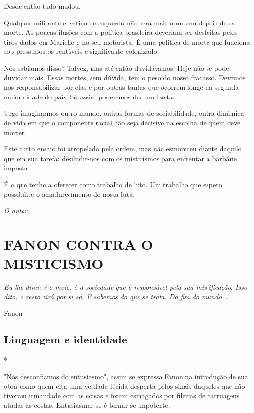 Desde então tudo mudou.

Qualquer militante e crítico de esquerda não será mais o mesmo depois
dessa morte. As poucas ilusões com a política brasileira deveriam ser
desfeitas pelos tiros dados em Marielle e no seu motorista. É uma
política de morte que funciona sob pressupostos rentáveis e significante
colonizado.

Nós sabíamos disso? Talvez, mas até então duvidávamos. Hoje não se pode
duvidar mais. Essas mortes, sem dúvida, tem o peso do nosso fracasso.
Devemos nos responsabilizar por elas e por outras tantas que ocorrem
longe da segunda maior cidade do país. Só assim poderemos dar um basta.

Urge imaginarmos outro mundo, outras formas de sociabilidade, outra
dinâmica de vida em que o componente racial não seja decisivo na escolha
de quem deve morrer.

Este curto ensaio foi atropelado pela ordem, mas não esmoreceu diante
daquilo que era sua tarefa: desiludir-nos com os misticismos para
enfrentar a barbárie imposta.

É o que tenho a oferecer como trabalho de luto. Um trabalho que espero
possibilite o amadurecimento de nossa luta.

\medskip

\begin{flushright}
\emph{O autor}
\end{flushright}

\part{FANON CONTRA O MISTICISMO}

\vspace*{\fill}

\epigraph{\emph{Eu lhe direi: é o meio, é a sociedade que é responsável pela sua
mistificação. Isso dito, o resto virá por si só. E sabemos do que se
trata. Do fim do mundo...}}{Fanon}

\thispagestyle{empty}

\chapter{Linguagem e identidade}

*

"Nós desconfiamos do entusiasmo", assim se expressa Fanon na introdução
de sua obra como quem cita uma verdade lúcida desperta pelos sinais
daqueles que não tiveram irmandade com as coisas e foram esmagados por
fileiras de carruagens atadas às costas. Entusiasmar-se é tornar-se
impotente.

